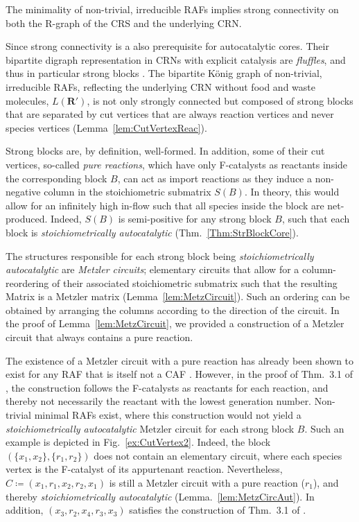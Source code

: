 \documentclass[pdflatex]{sn-jnl}
\theoremstyle{thmstyleone}%
\theoremstyle{examplesty}%
\theoremstyle{thmstylethree}%
\newcommand{\lord}{L}
\newcommand{\SM}{S}
\newcommand{\RAF}[0]{\mathbf{R}'}
\newcommand{\PFS}[1]{\begingroup\color{cyan}#1\endgroup}
\begin{document}
The minimality of non-trivial, irreducible RAFs
implies strong connectivity on both the R-graph of the CRS and the
underlying CRN. 

Since strong connectivity is a also prerequisite for autocatalytic cores.
Their bipartite digraph representation in CRNs with explicit catalysis are
\emph{fluffles}, and thus in particular strong blocks
\cite{golnik_autocatalytic_2026}. The bipartite K\"onig graph of
non-trivial, irreducible RAFs, reflecting the underlying CRN without food
and waste molecules, $\lord(\RAF)$, \PFS{is not only strongly connected but
  composed of strong blocks that are separated by cut vertices that are
  always reaction vertices and never species vertices
  (Lemma~\ref{lem:CutVertexReac}).}

Strong blocks are, by definition, well-formed. In addition, some of their
cut vertices, so-called \emph{pure reactions}, which have only F-catalysts
as reactants inside the corresponding block $B$, can act as import
reactions as they induce a non-negative column in the stoichiometric
submatrix $\SM(B)$. In theory, this would allow for an infinitely high
in-flow such that all species inside the block are net-produced. Indeed,
$\SM(B)$ is semi-positive for any strong block $B$, such that each block is
\emph{stoichiometrically autocatalytic} (Thm.~\ref{Thm:StrBlockCore}).

The structures responsible for each strong block being
\emph{stoichiometrically autocatalytic} are \emph{Metzler circuits};
elementary circuits that allow for a column-reordering of their associated
stoichiometric submatrix such that the resulting Matrix is a Metzler matrix
(Lemma~\ref{lem:MetzCircuit}). Such an ordering can be obtained by
arranging the columns according to the direction of the circuit. In the
proof of Lemma~\ref{lem:MetzCircuit}, we provided a construction of a
Metzler circuit that always contains a pure reaction.

The existence of a Metzler circuit with a pure reaction has already been
shown to exist for any RAF that is itself not a CAF
\cite{golnik_bridging_2026}. However, in the proof of Thm.~3.1 of
\cite{golnik_bridging_2026}, the construction follows the F-catalysts as
reactants for each reaction, and thereby not necessarily the reactant with
the lowest generation number. Non-trivial minimal RAFs exist, where this
construction would not yield a \emph{stoichiometrically autocatalytic}
Metzler circuit for each strong block $B$. Such an example is depicted in
Fig.~\ref{ex:CutVertex2}. Indeed, the block $(\{x_1,x_2\}, \{r_1,r_2\})$
does not contain an elementary circuit, where each species vertex is the
F-catalyst of its appurtenant reaction. Nevertheless, $C\coloneqq
(x_1,r_1,x_2,r_2,x_1)$ is still a Metzler circuit with a pure reaction
($r_1$), and thereby \emph{stoichiometrically autocatalytic}
(Lemma.~\ref{lem:MetzCircAut}). In addition, $(x_3,r_2,x_4,r_3, x_3)$
satisfies the construction of Thm.~3.1 of \cite{golnik_bridging_2026}.
\end{document}
